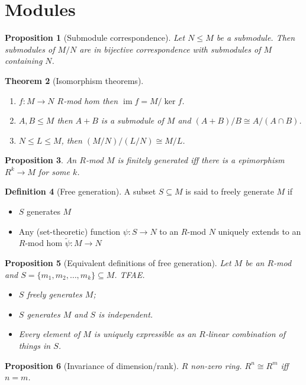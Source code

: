 \documentclass{article}
\theoremstyle{definition}
\newtheorem{defn}{Definition}[section]
\theoremstyle{remark}
\theoremstyle{plain}
\newtheorem{thm}[defn]{Theorem}
\newtheorem{prop}[defn]{Proposition}
\theoremstyle{definition}
\begin{document}
\section{Modules}
\begin{prop}[Submodule correspondence]
    Let $N\le M$ be a submodule. Then submodules of $M/N$ are in bijective correspondence with submodules of $M$ containing $N$.
\end{prop}
\begin{thm}[Isomorphism theorems]
    \begin{enumerate}
        \item $f:M\to N$ $R$-mod hom then $\operatorname{im}f=M/\ker f$.
        \item $A,B\le M$ then $A+B$ is a submodule of $M$ and $(A+B)/B\cong A/(A\cap B)$.
        \item $N\le L\le M$, then $(M/N)/(L/N)\cong M/L$.
    \end{enumerate}
\end{thm}
\begin{prop}
    An $R$-mod $M$ is finitely generated iff there is a epimorphism $R^k\to M$ for some $k$.
\end{prop}
\begin{defn}[Free generation]
    A subset $S\subseteq M$ is said to freely generate $M$ if 
    \begin{itemize}
        \item $S$ generates $M$
        \item Any (set-theoretic) function $\psi:S\to N$ to an $R$-mod $N$ uniquely extends to an $R$-mod hom $\tilde\psi:M\to N$
    \end{itemize}
\end{defn}
\begin{prop}[Equivalent definitions of free generation]
    Let $M$ be an $R$-mod and $S=\{m_1,m_2,\ldots,m_k\}\subseteq M$. TFAE.
    \begin{itemize}
        \item $S$ freely generates $M$;
        \item $S$ generates $M$ and $S$ is independent.
        \item Every element of $M$ is uniquely expressible as an $R$-linear combination of things in $S$.
    \end{itemize}
\end{prop}
\begin{prop}[Invariance of dimension/rank]
    $R$ non-zero ring. $R^n\cong R^m$ iff $n=m$.
\end{prop}
\end{document}
